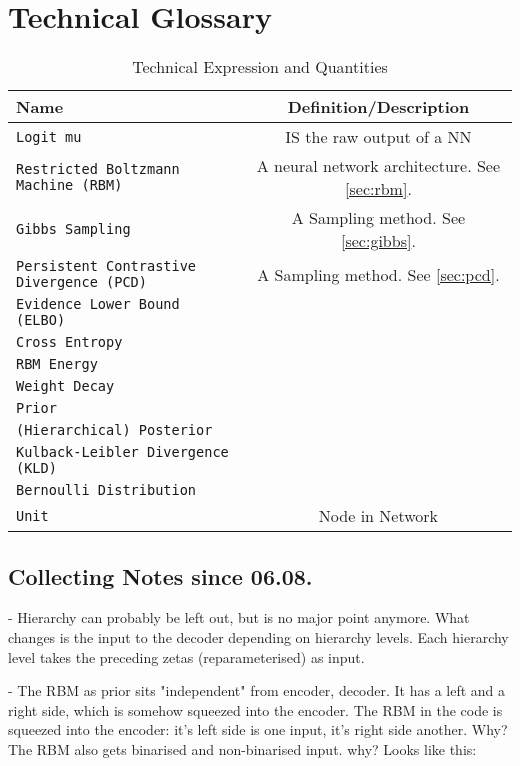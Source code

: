 \section{Technical Glossary}
\begin{table}[ht]
	\caption{Technical Expression and Quantities}%
	\label{tab:techExp}
	\centering
	\begin{tabular}{lc}
	\toprule
	Name & Definition/Description \\
  \midrule
  \texttt{Logit mu} & IS the raw output of a NN \\
  \texttt{Restricted Boltzmann Machine (RBM)} & A neural network architecture.
  See \ref{sec:rbm}.\\
  \texttt{Gibbs Sampling} & A Sampling method. See \ref{sec:gibbs}.\\
  \texttt{Persistent Contrastive Divergence (PCD)} & A Sampling method. See
  \ref{sec:pcd}.\\
  \texttt{Evidence Lower Bound (ELBO)} & \\
  \texttt{Cross Entropy} & \\
  \texttt{RBM Energy} & \\
  \texttt{Weight Decay} & \\
  \texttt{Prior} & \\
  \texttt{(Hierarchical) Posterior} & \\
  \texttt{Kulback-Leibler Divergence (KLD)} & \\
  \texttt{Bernoulli Distribution} & \\
  \texttt{Unit} & Node in Network \\
  \bottomrule
  \end{tabular}
\end{table}

\subsection{Collecting Notes since 06.08.}
- Hierarchy can probably be left out, but is no major point anymore. What
changes is the input to the decoder depending on hierarchy levels. Each
hierarchy level takes the preceding zetas (reparameterised) as input.

- The RBM as prior sits "independent" from encoder, decoder. It has a left and a
right side, which is somehow squeezed into the encoder. The RBM in the code is
squeezed into the encoder: it's left side is one input, it's right side another.
Why? The RBM also gets binarised and non-binarised input. why? Looks like this: 

